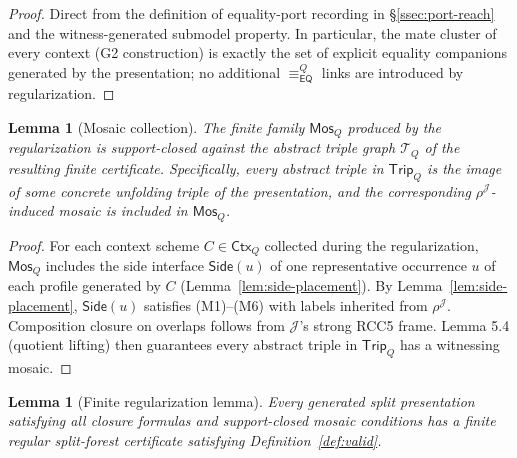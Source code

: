 \documentclass[11pt]{article}
\newtheorem{lemma}[theorem]{Lemma}
\newcommand{\EQ}{\mathsf{EQ}}
\newcommand{\J}{\mathcal J}
\newcommand{\Mos}{\mathsf{Mos}}
\newcommand{\Ctx}{\mathsf{Ctx}}
\newcommand{\eqc}{\equiv_{\EQ}}
\newcommand{\Trip}{\mathsf{Trip}}
\newcommand{\Side}{\mathsf{Side}}
\begin{document}
\begin{proof}
Direct from the definition of equality-port recording in
\S\ref{ssec:port-reach} and the witness-generated submodel
property.  In particular, the mate cluster of every context (G2
construction) is exactly the set of explicit equality companions
generated by the presentation; no additional $\eqc^Q$ links are
introduced by regularization.
\end{proof}

\begin{lemma}[Mosaic collection]\label{lem:mosaic-collection}
The finite family $\Mos_Q$ produced by the regularization is
support-closed against the abstract triple graph $\mathcal T_Q$ of
the resulting finite certificate.  Specifically, every abstract
triple in $\Trip_Q$ is the image of some concrete unfolding triple
of the presentation, and the corresponding $\rho^\J$-induced mosaic
is included in $\Mos_Q$.
\end{lemma}

\begin{proof}
For each context scheme $C\in\Ctx_Q$ collected during the
regularization, $\Mos_Q$ includes the side interface
$\Side(u)$ of one representative occurrence $u$ of each profile
generated by $C$ (Lemma~\ref{lem:side-placement}).  By
Lemma~\ref{lem:side-placement}, $\Side(u)$ satisfies (M1)--(M6)
with labels inherited from $\rho^\J$.  Composition closure on
overlaps follows from $\J$'s strong RCC5 frame.  Lemma 5.4 (quotient
lifting) then guarantees every abstract triple in $\Trip_Q$ has a
witnessing mosaic.
\end{proof}

\begin{lemma}[Finite regularization lemma]\label{lem:regularization}
Every generated split presentation satisfying all closure formulas
and support-closed mosaic conditions has a finite regular
split-forest certificate satisfying Definition~\ref{def:valid}.
\end{lemma}
\end{document}
